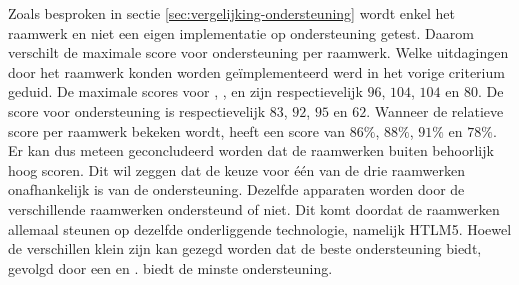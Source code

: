 \begin{table}
\centering
{}
\caption{Ondersteuning per apparaat.}
\label{tabel:evaluatie-ondersteuning-a}
\end{table}

Zoals besproken in sectie \ref{sec:vergelijking-ondersteuning} wordt enkel het raamwerk en niet een eigen implementatie op ondersteuning getest.
Daarom verschilt de maximale score voor ondersteuning per raamwerk.
Welke uitdagingen door het raamwerk konden worden geïmplementeerd werd in het vorige criterium geduid.
De maximale scores voor \st{},  \kendo{},  \jqm{} en \lungo{} zijn respectievelijk $96$, $104$, $104$ en $80$.
De score voor ondersteuning is respectievelijk $83$, $92$, $95$ en $62$.
Wanneer de relatieve score per raamwerk bekeken wordt, heeft \st{} een score van $86\%$,  \kendo{} $88\%$,  \jqm{} $91\%$ en \lungo{} $78\%$.
Er kan dus meteen geconcludeerd worden dat de raamwerken buiten \lungo{} behoorlijk hoog scoren.
Dit wil zeggen dat de keuze voor één van de drie raamwerken onafhankelijk is van de ondersteuning.
Dezelfde apparaten worden door de verschillende raamwerken ondersteund of niet.
Dit komt doordat de raamwerken allemaal steunen op dezelfde onderliggende technologie, namelijk HTLM5.
Hoewel de verschillen klein zijn kan gezegd worden dat \jqm{} de beste ondersteuning biedt,  gevolgd door een \kendo{} en \st{}.
\lungo{} biedt de minste ondersteuning.

